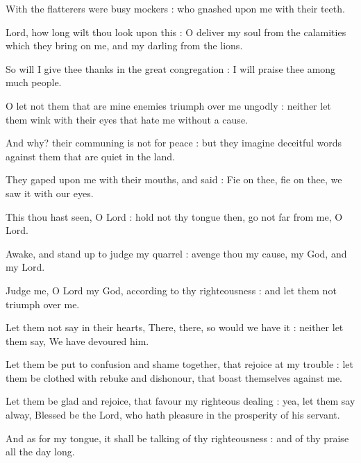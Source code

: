 With the flatterers were busy mockers : who gnashed upon me with their teeth.\par
{}Lord, how long wilt thou look upon this : O deliver my soul from the calamities which they bring on me, and my darling from the lions.\par
{}So will I give thee thanks in the great congregation : I will praise thee among much people.\par
{}O let not them that are mine enemies triumph over me ungodly : neither let them wink with their eyes that hate me without a cause.\par
{}And why? their communing is not for peace : but they imagine deceitful words against them that are quiet in the land.\par
{}They gaped upon me with their mouths, and said : Fie on thee, fie on thee, we saw it with our eyes.\par
{}This thou hast seen, O Lord : hold not thy tongue then, go not far from me, O Lord.\par
{}Awake, and stand up to judge my quarrel : avenge thou my cause, my God, and my Lord.\par
{}Judge me, O Lord my God, according to thy righteousness : and let them not triumph over me.\par
{}Let them not say in their hearts, There, there, so would we have it : neither let them say, We have devoured him.\par
{}Let them be put to confusion and shame together, that rejoice at my trouble : let them be clothed with rebuke and dishonour, that boast themselves against me.\par
{}Let them be glad and rejoice, that favour my righteous dealing : yea, let them say alway, Blessed be the Lord, who hath pleasure in the prosperity of his servant.\par
{}And as for my tongue, it shall be talking of thy righteousness : and of thy praise all the day long.\par


